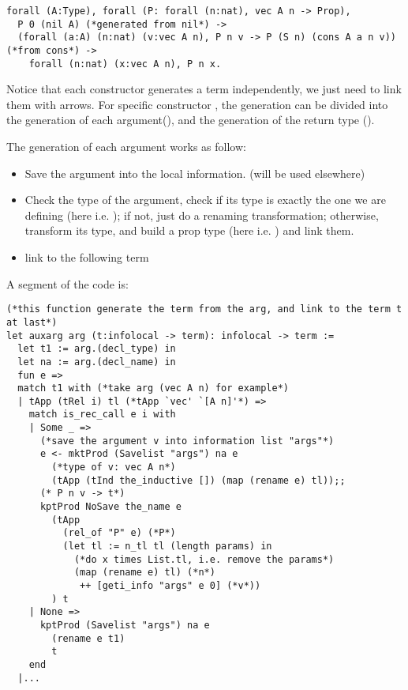 \documentclass[a4paper,UKenglish,cleveref, autoref, thm-restate]{lipics-v2021}
\begin{document}
\begin{lstlisting}[language = {Coq}, basicstyle = \small]
forall (A:Type), forall (P: forall (n:nat), vec A n -> Prop),
  P 0 (nil A) (*generated from nil*) ->
  (forall (a:A) (n:nat) (v:vec A n), P n v -> P (S n) (cons A a n v)) (*from cons*) ->
    forall (n:nat) (x:vec A n), P n x.
\end{lstlisting}

Notice that each constructor generates a term independently, we just need to link them with arrows. For specific constructor , the generation can be divided into the generation of each argument(), and the generation of the return type ().

The generation of each argument works as follow:

\begin{itemize}
    \item Save the argument into the local information. (will be used elsewhere)
    \item Check the type of the argument, check if its type is exactly the one we are defining (here i.e. ); if not, just do a renaming transformation; otherwise, transform its type, and build a prop type (here i.e. ) and link them.

    \item link to the following term
\end{itemize}

A segment of the code is:

\begin{lstlisting}[language = {Coq}, basicstyle = \small]
(*this function generate the term from the arg, and link to the term t at last*)
let auxarg arg (t:infolocal -> term): infolocal -> term :=
  let t1 := arg.(decl_type) in
  let na := arg.(decl_name) in
  fun e =>
  match t1 with (*take arg (vec A n) for example*)
  | tApp (tRel i) tl (*tApp `vec' `[A n]'*) =>
    match is_rec_call e i with
    | Some _ =>
      (*save the argument v into information list "args"*)
      e <- mktProd (Savelist "args") na e
        (*type of v: vec A n*)
        (tApp (tInd the_inductive []) (map (rename e) tl));;
      (* P n v -> t*)    
      kptProd NoSave the_name e
        (tApp
          (rel_of "P" e) (*P*)
          (let tl := n_tl tl (length params) in 
            (*do x times List.tl, i.e. remove the params*)
            (map (rename e) tl) (*n*) 
             ++ [geti_info "args" e 0] (*v*))
        ) t
    | None =>
      kptProd (Savelist "args") na e
        (rename e t1)
        t
    end
  |...
\end{lstlisting}
\end{document}
